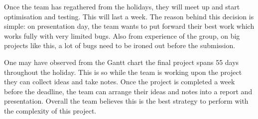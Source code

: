 	Once the team has regathered from the holidays, they will meet up and start optimisation and testing. This will last a week. The reason behind this decision is simple: on presentation day, the team wants to put forward their best work which works fully with very limited bugs. Also from experience of the group, on big projects like this, a lot of bugs need to be ironed out before the submission.

	One may have observed from the Gantt chart the final project spans 55 days throughout the holiday. This is so while the team is working upon the project they can collect ideas and take notes. Once the project is completed a week before the deadline, the team can arrange their ideas and notes into a report and presentation. Overall the team believes this is the best strategy to perform with the complexity of this project. 



